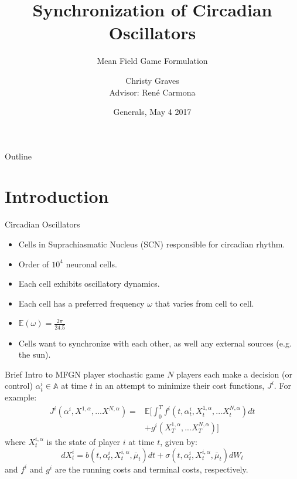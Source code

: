 \documentclass{beamer}
\title{Synchronization of Circadian Oscillators}
\subtitle{Mean Field Game Formulation}
\author[Christy Graves]{Christy Graves\\{\small Advisor: Ren\'{e} Carmona}}
\institute[Princeton University] %
{
	Program in Applied and Computational Mathematics\\
	Princeton University
}
\date{Generals, May 4 2017}
\begin{document}
\begin{frame}
  \titlepage
\end{frame}

\begin{frame}{Outline}
  \tableofcontents
\end{frame}

\section{Introduction}

\begin{frame}{Circadian Oscillators}
	\begin{itemize}
		\item {
			Cells in Suprachiasmatic Nucleus (SCN) responsible for circadian rhythm.
		}
		\item Order of $10^4$ neuronal cells.
		\item Each cell exhibits oscillatory dynamics.
		\item Each cell has a preferred frequency $\omega$ that varies from cell to cell.
		\item $\mathbb{E}(\omega)=\frac{2\pi}{24.5}$
		\item Cells want to synchronize with each other, as well any external sources (e.g. the sun).
	\end{itemize}
\end{frame}


\begin{frame}{Brief Intro to MFG}{N player stochastic game}
		$N$ players each make a decision (or control) $\alpha_t^i \in \mathbb{A}$ at time $t$ in an attempt to minimize their cost functions, $J^i$. For example:
		\begin{equation}
		\begin{split}
		J^i(\alpha^i,X^{1,\alpha},...X^{N,\alpha})=&\mathbb{E}\Bigg[\int_{0}^{T}f^i(t,\alpha_t^i,X_t^{1,\alpha},...X_t^{N,\alpha})dt \\
		&+g^i(X_T^{1,\alpha},...X_T^{N,\alpha}) \Bigg]
		\end{split}
		\end{equation}
		where $X_t^{i,\alpha}$ is the state of player $i$ at time $t$, given by:
		\begin{equation}
		dX_t^i=b(t,\alpha_t^i,X_t^{i,\alpha},\bar{\mu}_t)dt+\sigma(t,\alpha_t^i,X_t^{i,\alpha},\bar{\mu}_t)dW_t
		\end{equation}
		and $f^i$ and $g^i$ are the running costs and terminal costs, respectively.
\end{frame}
\end{document}
